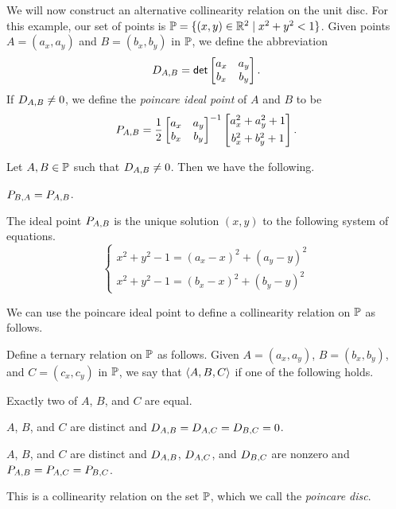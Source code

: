 We will now construct an alternative collinearity relation on the unit disc.
For this example, our set of points is \( \mathbb{P} = \{ (x,y) \in \mathbb{R}^2 \mid x^2 + y^2 < 1 \}\).
Given points \(A = (a_x, a_y)\) and \(B = (b_x, b_y)\) in \(\mathbb{P}\), we define the abbreviation \[ D_{A,B} = \mathsf{det} \begin{bmatrix} a_x & a_y \\ b_x & b_y \end{bmatrix}. \]
If \(D_{A,B} \neq 0\), we define the \emph{poincare ideal point} of \(A\) and \(B\) to be \[ P_{A,B} = \frac{1}{2} \begin{bmatrix} a_x & a_y \\ b_x & b_y \end{bmatrix}^{-1} \begin{bmatrix} a_x^2 + a_y^2 + 1 \\[4pt] b_x^2 + b_y^2 + 1 \end{bmatrix}. \]

\begin{lem}\label{lem:pd-ideal-point}
Let \(A,B \in \mathbb{P}\) such that \(D_{A,B} \neq 0\).
Then we have the following.
\begin{proplist}
\item \label{lem:pd-ideal-point:sym} \(P_{B,A} = P_{A,B}\).
\item \label{lem:pd-ideal-point:eq} The ideal point \(P_{A,B}\) is the unique solution \((x,y)\) to the following system of equations.
\[ \left\{ \begin{array}{l} x^2 + y^2 - 1 = (a_x - x)^2 + (a_y - y)^2 \\[4pt] x^2 + y^2 - 1 = (b_x - x)^2 + (b_y - y)^2 \end{array} \right. \]
\end{proplist}
\end{lem}

We can use the poincare ideal point to define a collinearity relation on \(\mathbb{P}\) as follows.

\begin{prop}
Define a ternary relation on \(\mathbb{P}\) as follows.
Given \(A = (a_x,a_y)\), \(B = (b_x, b_y)\), and \(C = (c_x, c_y)\) in \(\mathbb{P}\), we say that \(\langle A, B, C \rangle\) if one of the following holds.
\begin{proplist}
\item Exactly two of \(A\), \(B\), and \(C\) are equal.
\item \(A\), \(B\), and \(C\) are distinct and \(D_{A,B} = D_{A,C} = D_{B,C} = 0\).
\item \(A\), \(B\), and \(C\) are distinct and \(D_{A,B}\), \(D_{A,C}\), and \(D_{B,C}\) are nonzero and \(P_{A,B} = P_{A,C} = P_{B,C}\).
\end{proplist}
This is a collinearity relation on the set \(\mathbb{P}\), which we call the \emph{poincare disc}.
\end{prop}

